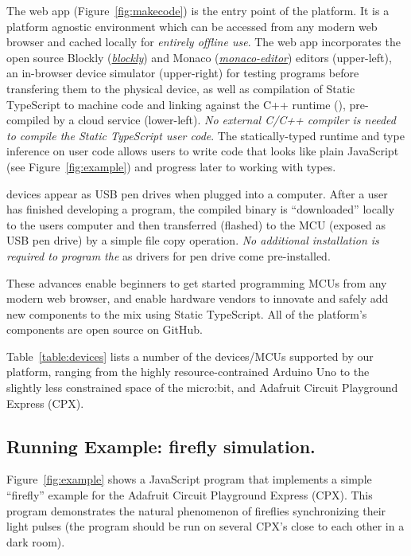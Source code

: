 The \MC web app (Figure~\ref{fig:makecode}) is the entry point of the platform. It is a platform agnostic environment which can be accessed from any modern web browser and cached locally for \emph{entirely offline use}. The \MC web app incorporates the open source Blockly (\emph{\href{https://github.com/google/blockly}{blockly}}) and Monaco (\emph{\href{https://github.com/Microsoft/monaco-editor}{monaco-editor}}) editors (upper-left), an in-browser device simulator (upper-right) for testing programs before transfering them to the physical device, as well as compilation of Static TypeScript to machine code and linking against the C++ runtime (\emph{\CON}), pre-compiled by a cloud service (lower-left). \emph{No external C/C++ compiler is needed to compile the Static TypeScript user code}. The statically-typed runtime and type inference on user code allows users to write code that looks like plain JavaScript (see Figure~\ref{fig:example}) and progress later to working with types.

\MC devices appear as USB pen drives when plugged into a computer. After a user has finished developing a program, the compiled binary is ``downloaded'' locally to the users computer and then transferred (flashed) to the MCU (exposed as USB pen drive) by a simple file copy operation. \emph{No additional installation is required to program the \MCU} as drivers for pen drive come pre-installed.

These advances enable beginners to get started programming MCUs from any modern web browser, and enable hardware vendors to innovate and safely add new components to the mix using Static TypeScript. All of the platform's components are open source on GitHub.

Table~\ref{table:devices} lists a number of the devices/MCUs supported by our platform,
ranging from the highly resource-contrained Arduino Uno to the slightly less constrained space of
the micro:bit, and Adafruit Circuit Playground Express (CPX).

\subsection{Running Example: firefly simulation.}

Figure~\ref{fig:example} shows a JavaScript
program that implements a simple ``firefly'' example
for the Adafruit Circuit Playground Express (CPX).
This program demonstrates the natural phenomenon
of fireflies synchronizing their light pulses (the program should be
run on several CPX's close to each other in a dark room).

